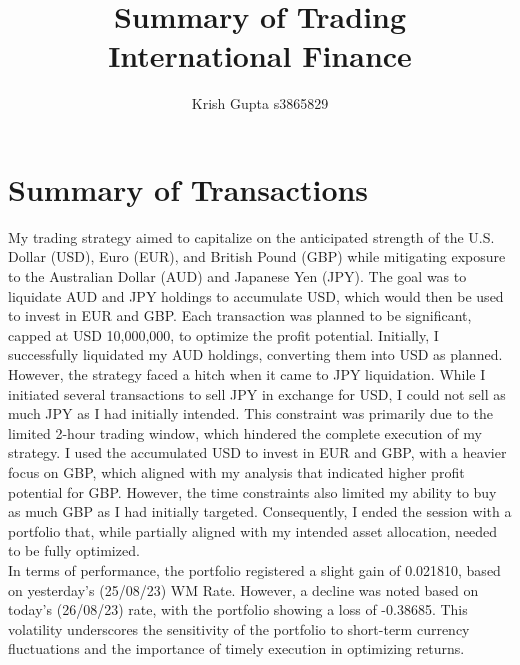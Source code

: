 \documentclass{article}
\title{Summary of Trading\\
        International Finance}
\author{Krish Gupta s3865829}
\begin{document}
\maketitle

\tableofcontents
\pagebreak

\section*{Summary of Transactions}
My trading strategy aimed to capitalize on the anticipated strength of the U.S. Dollar (USD), Euro (EUR), and British Pound (GBP) while mitigating exposure to the Australian Dollar (AUD) and Japanese Yen (JPY). The goal was to liquidate AUD and JPY holdings to accumulate USD, which would then be used to invest in EUR and GBP. Each transaction was planned to be significant, capped at USD 10,000,000, to optimize the profit potential.
Initially, I successfully liquidated my AUD holdings, converting them into USD as planned. However, the strategy faced a hitch when it came to JPY liquidation. While I initiated several transactions to sell JPY in exchange for USD, I could not sell as much JPY as I had initially intended. This constraint was primarily due to the limited 2-hour trading window, which hindered the complete execution of my strategy.
I used the accumulated USD to invest in EUR and GBP, with a heavier focus on GBP, which aligned with my analysis that indicated higher profit potential for GBP. However, the time constraints also limited my ability to buy as much GBP as I had initially targeted. Consequently, I ended the session with a portfolio that, while partially aligned with my intended asset allocation, needed to be fully optimized.\\

\noindent In terms of performance, the portfolio registered a slight gain of 0.021810, based on yesterday's (25/08/23) WM Rate. However, a decline was noted based on today's (26/08/23) rate, with the portfolio showing a loss of -0.38685. This volatility underscores the sensitivity of the portfolio to short-term currency fluctuations and the importance of timely execution in optimizing returns.
\end{document}
